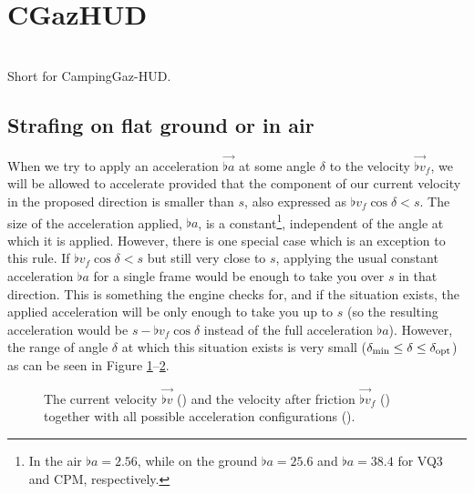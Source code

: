 \section{CGazHUD}
\label{sec:cgazhud}
\cite{injx_physics}\\
Short for CampingGaz-HUD.

\subsection{Strafing on flat ground or in air}
\label{sec:normal_strafe}
When we try to apply an acceleration $\vec{\flat{a}}$ at some angle $\delta$ to the velocity $\vec{\flat{v}}_f$, we will be allowed to accelerate provided that the component of our current velocity in the proposed direction is smaller than $s$, also expressed as $\flat{v}_f \cos\delta < s$. The size of the acceleration applied, $\flat{a}$, is a constant\footnote{In the air $\flat{a} = 2.56$, while on the ground $\flat{a} = 25.6$ and $\flat{a} = 38.4$ for VQ3 and CPM, respectively.}, independent of the angle at which it is applied. However, there is one special case which is an exception to this rule. If $\flat{v}_f \cos\delta < s$ but still very close to $s$, applying the usual constant acceleration $\flat{a}$ for a single frame would be enough to take you over $s$ in that direction. This is something the engine checks for, and if the situation exists, the applied acceleration will be only enough to take you up to $s$ (so the resulting acceleration would be $s - \flat{v}_f \cos\delta$ instead of the full acceleration $\flat{a}$). However, the range of angle $\delta$ at which this situation exists is very small ($\delta_{\min} \le \delta \le \delta_{\operatorname{opt}}$) as can be seen in Figure \ref{fig:delta_min_friction}--\ref{fig:delta_opt_friction}.
\begin{figure}[H]
	\centering
	\begin{subfigure}[t]{.33\textwidth}
		\centering
		\setlength\figureheight{5.5cm}
		\setlength\figurewidth{5.5cm}
		\caption{}
		\label{fig:delta_min_friction}
	\end{subfigure}%
	\begin{subfigure}[t]{.33\textwidth}
		\centering
		\setlength\figureheight{5.5cm}
		\setlength\figurewidth{5.5cm}
		\caption{}
		\label{fig:delta_opt_friction}
	\end{subfigure}%
	\begin{subfigure}[t]{.33\textwidth}
		\centering
		\setlength\figureheight{5.5cm}
		\setlength\figurewidth{5.5cm}
		\caption{}
		\label{fig:delta_max_friction}
	\end{subfigure}
	\caption{The current velocity $\vec{\flat{v}}$ (\yellowdenselydottedarrow) and the velocity after friction $\vec{\flat{v}}_f$ (\yellowarrow) together with all possible acceleration configurations (\lightorangearea).}
\end{figure}
